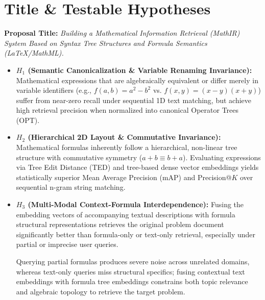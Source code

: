 \documentclass[11pt,a4paper]{article}
\begin{document}
\section{Title \& Testable Hypotheses}
\textbf{Proposal Title:} \textit{Building a Mathematical Information Retrieval (MathIR) System Based on Syntax Tree Structures and Formula Semantics (\LaTeX/MathML).}

\begin{itemize}
	\item \textbf{$H_1$ (Semantic Canonicalization \& Variable Renaming Invariance):} Mathematical expressions that are algebraically equivalent or differ merely in variable identifiers (e.g., $f(a,b) = a^2 - b^2$ vs. $f(x,y) = (x-y)(x+y)$) suffer from near-zero recall under sequential 1D text matching, but achieve high retrieval precision when normalized into canonical Operator Trees (OPT).
	\item \textbf{$H_2$ (Hierarchical 2D Layout \& Commutative Invariance):} Mathematical formulas inherently follow a hierarchical, non-linear tree structure with commutative symmetry ($a + b \equiv b + a$). Evaluating expressions via Tree Edit Distance (TED) and tree-based dense vector embeddings yields statistically superior Mean Average Precision (mAP) and Precision@$K$ over sequential n-gram string matching.
	\item \textbf{$H_3$ (Multi-Modal Context-Formula Interdependence):} Fusing the embedding vectors of accompanying textual descriptions with formula structural representations retrieves the original problem document significantly better than formula-only or text-only retrieval, especially under partial or imprecise user queries.
	
	Querying partial formulas produces severe noise across unrelated domains, whereas text-only queries miss structural specifics; fusing contextual text embeddings with formula tree embeddings constrains both topic relevance and algebraic topology to retrieve the target problem.
\end{itemize}

\end{document}
